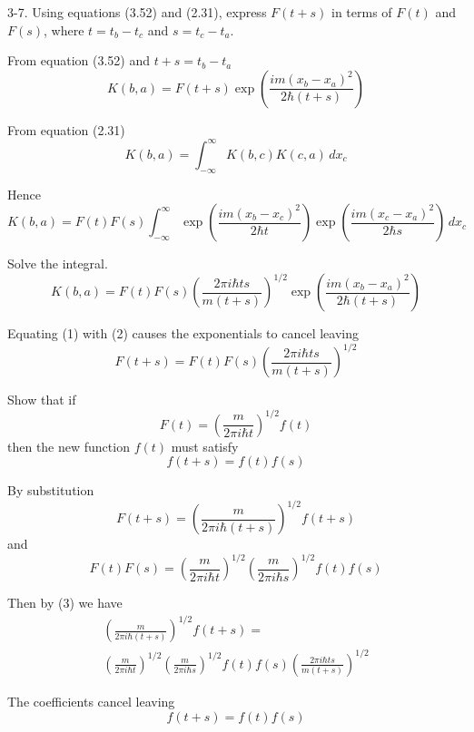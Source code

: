 \documentclass[12pt]{article}
\begin{document}
3-7.
Using equations (3.52) and (2.31),
express $F(t+s)$ in terms of $F(t)$ and $F(s)$,
where $t=t_b-t_c$ and $s=t_c-t_a$.

\bigskip
From equation (3.52) and $t+s=t_b-t_a$
\begin{equation*}
K(b,a)=F(t+s)\exp\left(\frac{im(x_b-x_a)^2}{2\hbar (t+s)}\right)
\tag{1}
\end{equation*}

From equation (2.31)
\begin{equation*}
K(b,a)=\int_{-\infty}^\infty K(b,c)K(c,a)\,dx_c
\end{equation*}

Hence
\begin{equation*}
K(b,a)=F(t)F(s)\int_{-\infty}^\infty
\exp\left(\frac{im(x_b-x_c)^2}{2\hbar t}\right)
\exp\left(\frac{im(x_c-x_a)^2}{2\hbar s}\right)
\,dx_c
\end{equation*}

Solve the integral.
\begin{equation*}
K(b,a)=F(t)F(s)
\left(\frac{2\pi i\hbar ts}{m(t+s)}\right)^{1/2}
\exp\left(\frac{im(x_b-x_a)^2}{2\hbar(t+s)}\right)
\tag{2}
\end{equation*}

Equating (1) with (2) causes the exponentials to cancel leaving
\begin{equation*}
F(t+s)=F(t)F(s)\left(\frac{2\pi i\hbar ts}{m(t+s)}\right)^{1/2}
\tag{3}
\end{equation*}

Show that if
\begin{equation*}
F(t)=\left(\frac{m}{2\pi i\hbar t}\right)^{1/2} f(t)
\end{equation*}
then the new function $f(t)$ must satisfy
\begin{equation*}
f(t+s)=f(t)f(s)
\end{equation*}

By substitution
\begin{equation*}
F(t+s)=\left(\frac{m}{2\pi i\hbar (t+s)}\right)^{1/2} f(t+s)
\end{equation*}
and
\begin{equation*}
F(t)F(s)=
\left(\frac{m}{2\pi i\hbar t}\right)^{1/2}
\left(\frac{m}{2\pi i\hbar s}\right)^{1/2}
f(t)f(s)
\end{equation*}

Then by (3) we have
\begin{multline*}
\left(\frac{m}{2\pi i\hbar(t+s)}\right)^{1/2}
f(t+s)=
\\
\left(\frac{m}{2\pi i\hbar t}\right)^{1/2}
\left(\frac{m}{2\pi i\hbar s}\right)^{1/2}
f(t)f(s)
\left(\frac{2\pi i\hbar ts}{m(t+s)}\right)^{1/2}
\end{multline*}

The coefficients cancel leaving
\begin{equation*}
f(t+s)=f(t)f(s)
\tag{4}
\end{equation*}
\end{document}
